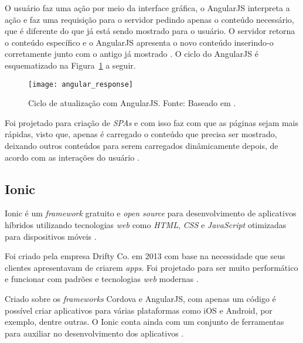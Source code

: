 O usuário faz uma ação por meio da interface gráfica, 
o AngularJS interpreta a ação e faz uma requisição para o servidor pedindo apenas o conteúdo necessário, que é 
diferente do que já está sendo mostrado para o usuário. 
O servidor retorna o conteúdo específico e o AngularJS apresenta o novo conteúdo inserindo-o corretamente junto 
com o antigo já mostrado \cite{ursino_angularjs:_2015}. O ciclo do AngularJS é esquematizado na Figura~\ref{fig:angular_response} a seguir.

\begin{figure}[h]
  \centering
    \texttt{[image: angular\_response]}
    \caption[Ciclo de atualização com AngularJS]{ Ciclo de atualização com AngularJS. Fonte: Baseado em \cite{ursino_angularjs:_2015}.}
	\label{fig:angular_response}
\end{figure}

Foi projetado para criação de \textit{SPAs} e com isso faz com que as páginas sejam mais rápidas, visto que, apenas é carregado o conteúdo que precisa ser mostrado, 
deixando outros conteúdos para serem carregados dinâmicamente depois, de acordo com as interações do usuário \cite{rodriguez_diseno_2015}.

\subsection{Ionic} \label{subsection:ionic}
Ionic é um \textit{framework} gratuito e \textit{open source} para desenvolvimento de aplicativos híbridos utilizando tecnologias 
\textit{web} como \textit{HTML}, \textit{CSS} e \textit{JavaScript} otimizadas para dispositivos móveis \cite{drifty_ionic:_2016}. 

Foi criado pela empresa Drifty Co. em 2013 com base na necessidade que seus clientes apresentavam de criarem \textit{apps}. 
Foi projetado para ser muito performático e funcionar com padrões e tecnologias \textit{web} modernas \cite{drifty_about_2016}.

Criado sobre os \textit{frameworks} Cordova e AngularJS, com apenas um código é possível criar aplicativos para várias 
plataformas como iOS e Android, por exemplo, dentre outras. O Ionic conta ainda com um conjunto de ferramentas para auxiliar 
no desenvolvimento dos aplicativos \cite{drifty_ionic:_2016}.

